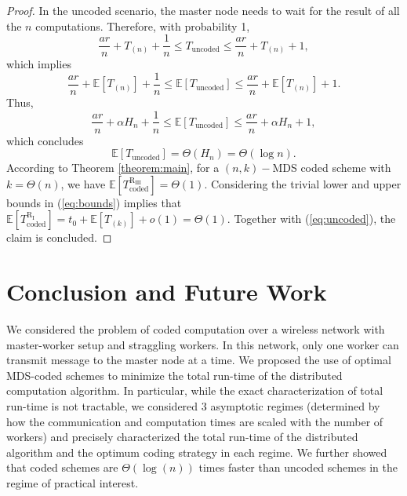 \documentclass[onecolumn,journal,twoside]{IEEEtran}
\newcommand{\Expc}{\mathbb{E}}
\begin{document}
\begin{proof}

In the uncoded scenario, the master node needs to wait for the result of all the $n$ computations. Therefore, with probability 1,
\begin{equation}
    \frac{ar}{n}+T_{(n)}+\frac{1}{n} \leq T_{\text{uncoded}} \leq \frac{ar}{n}+T_{(n)}+1,
\end{equation}
which implies 
\begin{equation}
    \frac{ar}{n}+\Expc[T_{(n)}]+\frac{1}{n} \leq \Expc[T_{\text{uncoded}}] \leq \frac{ar}{n}+\Expc[T_{(n)}]+1.
\end{equation}
Thus, 
\begin{equation}
    \frac{ar}{n}+\alpha H_n +\frac{1}{n} \leq \Expc[T_{\text{uncoded}}] \leq  \frac{ar}{n}+\alpha H_n +1,
\end{equation}
which concludes
\begin{equation}\label{eq:uncoded}
    \Expc[T_{\text{uncoded}}]=\Theta(H_n)=\Theta(\log n).
\end{equation}
According to Theorem \ref{theorem:main}, for a $(n,k)-$MDS coded scheme with $k=\Theta(n)$, we have $\Expc[T^{\text{R}_{\text{III}}}_{\text{coded}}]=\Theta(1)$. Considering the trivial lower and upper bounds in (\ref{eq:bounds}) implies that $\Expc[T^{\text{R}_{\text{I}}}_{\text{coded}}]=t_0+\Expc[T_{(k)}]+o(1)=\Theta(1)$. Together with (\ref{eq:uncoded}), the claim is concluded.
\end{proof}






\section{Conclusion and Future Work}

We considered the problem of coded computation over a wireless network with master-worker setup and straggling workers. In this network, only one worker can transmit message to the master node at a time. We proposed the use of optimal MDS-coded schemes to minimize the total run-time of the distributed computation algorithm. In particular, while the exact characterization of total run-time is not tractable, we considered 3 asymptotic regimes (determined by how the communication and computation times are scaled with the number of workers) and precisely characterized the total run-time of the distributed algorithm and the optimum coding strategy in each regime. We further showed that coded schemes are $\Theta(\log(n))$ times faster than uncoded schemes in the regime of practical interest. 
\end{document}
